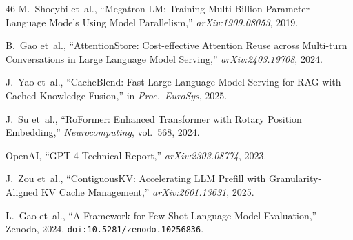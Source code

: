 \documentclass[conference]{IEEEtran}
\begin{document}
\begin{thebibliography}{46}
 M.~Shoeybi et~al., ``Megatron-LM: Training Multi-Billion Parameter Language Models Using Model Parallelism,'' \textit{arXiv:1909.08053}, 2019.

 B.~Gao et~al., ``AttentionStore: Cost-effective Attention Reuse across Multi-turn Conversations in Large Language Model Serving,'' \textit{arXiv:2403.19708}, 2024.

 J.~Yao et~al., ``CacheBlend: Fast Large Language Model Serving for RAG with Cached Knowledge Fusion,'' in \textit{Proc.\ EuroSys}, 2025.

 J.~Su et~al., ``RoFormer: Enhanced Transformer with Rotary Position Embedding,'' \textit{Neurocomputing}, vol.~568, 2024.

 OpenAI, ``GPT-4 Technical Report,'' \textit{arXiv:2303.08774}, 2023.

 J.~Zou et~al., ``ContiguousKV: Accelerating LLM Prefill with Granularity-Aligned KV Cache Management,'' \textit{arXiv:2601.13631}, 2025.

 L.~Gao et~al., ``A Framework for Few-Shot Language Model Evaluation,'' Zenodo, 2024. \texttt{doi:10.5281/zenodo.10256836}.

\end{thebibliography}
\end{document}
